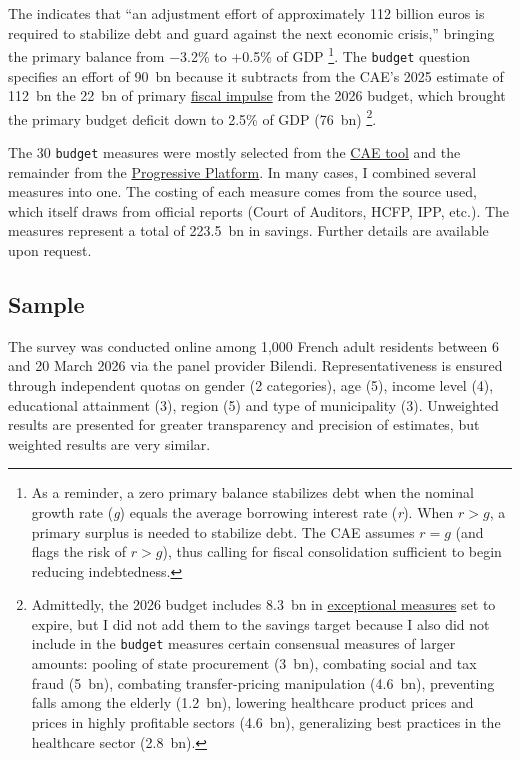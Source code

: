 \documentclass[12pt,english]{article}
\begin{document}
The \cite{CAE2025} indicates that ``an adjustment effort of approximately 112 billion euros is required to stabilize debt and guard against the next economic crisis,'' bringing the primary balance from $-$3.2\% to +0.5\% of GDP%
\footnote{As a reminder, a zero primary balance stabilizes debt when the nominal growth rate (\textit{g}) equals the average borrowing interest rate (\textit{r}). When $r>g$, a primary surplus is needed to stabilize debt. The CAE assumes $r=g$ (and flags the risk of $r>g$), thus calling for fiscal consolidation sufficient to begin reducing indebtedness.}.
The \texttt{budget} question specifies an effort of 90~bn because it subtracts from the CAE's 2025 estimate of 112~bn the 22~bn of primary \href{https://www.ofce.sciences-po.fr/blog2024/fr/2026/20260228_MPPIMRS/}{fiscal impulse} from the 2026 budget, which brought the primary budget deficit down to 2.5\% of GDP (76~bn)%
\footnote{Admittedly, the 2026 budget includes 8.3~bn in \href{https://www.ofce.sciences-po.fr/blog2024/fr/2026/20260228_MPPIMRS/}{exceptional measures} set to expire, but I did not add them to the savings target because I also did not include in the \texttt{budget} measures certain consensual measures of larger amounts: pooling of state procurement (3~bn), combating social and tax fraud (5~bn), combating transfer-pricing manipulation (4.6~bn), preventing falls among the elderly (1.2~bn), lowering healthcare product prices and prices in highly profitable sectors (4.6~bn), generalizing best practices in the healthcare sector (2.8~bn).}.

The 30 \texttt{budget} measures were mostly selected from the \href{https://claude.ai/public/artifacts/74cd0701-a4f0-499e-a409-cae1da524ee4}{CAE tool} and the remainder from the \href{https://laplateformeprogressiste.org/wp-content/uploads/2025/12/20251210_Resultats-par-mesure-1.pdf}{Progressive Platform}. In many cases, I combined several measures into one. The costing of each measure comes from the source used, which itself draws from official reports (Court of Auditors, HCFP, IPP, etc.). The measures represent a total of 223.5~bn in savings. Further details are available upon request.

\subsection{Sample}

The survey was conducted online among 1,000 French adult residents between 6 and 20 March 2026 via the panel provider Bilendi.
Representativeness is ensured through independent quotas on gender (2 categories), age (5), income level (4), educational attainment (3), region (5) and type of municipality (3).
Unweighted results are presented for greater transparency and precision of estimates, but weighted results are very similar.
\end{document}
